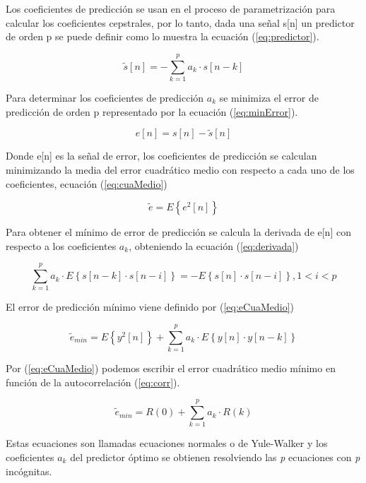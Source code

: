 Los coeficientes de predicción se usan en el proceso de parametrización para calcular los coeficientes cepstrales, por lo tanto, dada una señal s[n] un predictor de orden p se puede definir como lo muestra la ecuación (\ref{eq:predictor}).

\begin{equation}\label{eq:predictor}
	\tilde{s}[n]=-\sum_{k=1}^{p}{a_k\cdot s[n-k]}
\end{equation}

Para determinar los coeficientes de predicción $a_k$ se minimiza el error de predicción de orden p representado por la ecuación (\ref{eq:minError}).

\begin{equation}\label{eq:minError}
	e[n]=s[n]-\tilde{s}[n]
\end{equation}

Donde e[n] es la señal de error, los coeficientes de predicción se calculan minimizando la media del error cuadrático medio con respecto a cada uno de los coeficientes, ecuación (\ref{eq:cuaMedio})

\begin{equation}\label{eq:cuaMedio}
	\tilde{e}=E\left \{e^2[n]\right \}
\end{equation}

Para obtener el mínimo de error de predicción se calcula la derivada de e[n] con respecto a los coeficientes $a_k$, obteniendo la ecuación (\ref{eq:derivada})

\begin{equation}\label{eq:derivada}
	\sum_{k=1}^{p} {a_k\cdot E\left \{  s[n-k]\cdot s[n-i] \right \}} = -E\left \{ s[n]\cdot s[n-i]\right \}, 1<i<p
\end{equation}

El error de predicción mínimo viene definido por (\ref{eq:eCuaMedio})

\begin{equation}\label{eq:eCuaMedio}
	\tilde{e}_{min}=E\left \{ y^2[n]\right \} +\sum_{k=1}^{p}{a_k\cdot E\left \{ y[n]\cdot y[n-k]\right \}}
\end{equation}

Por (\ref{eq:eCuaMedio}) podemos escribir el error cuadrático medio mínimo en función de la autocorrelación (\ref{eq:corr}).

\begin{equation}\label{eq:corr}
	\tilde{e}_{min}=R(0)+\sum_{k=1}^{p}{a_k\cdot R(k)}
\end{equation}

Estas ecuaciones son llamadas ecuaciones normales o de Yule-Walker y los coeficientes $a_k$ del predictor óptimo se obtienen resolviendo las \textit{p} ecuaciones con \textit{p} incógnitas. \cite{SalcedoCherubini2006}

